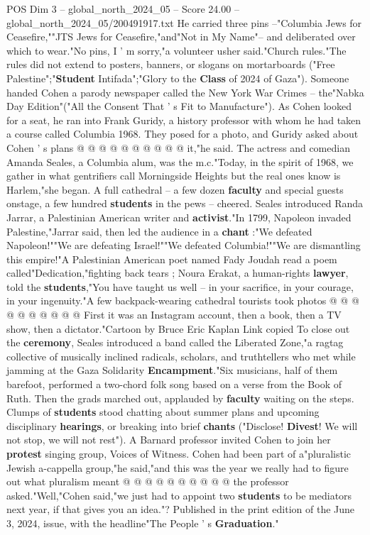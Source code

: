 \begin{textsample}{POS Dim 3 – global\_north\_2024\_05 – Score 24.00 – global\_north\_2024\_05/200491917.txt}
He carried three pins --"Columbia Jews for Ceasefire,""JTS Jews for Ceasefire,"and"Not in My Name"-- and deliberated over which to wear."No pins, I ' m sorry,"a volunteer usher said."Church rules."The rules did not extend to posters, banners, or slogans on mortarboards ("Free Palestine";"\textbf{Student} Intifada";"Glory to the \textbf{Class} of 2024 of Gaza").
Someone handed Cohen a parody newspaper called the New York War Crimes -- the"Nabka Day Edition"("All the Consent That ' s Fit to Manufacture").
As Cohen looked for a seat, he ran into Frank Guridy, a history professor with whom he had taken a course called Columbia 1968.
They posed for a photo, and Guridy asked about Cohen ' s plans @ @ @ @ @ @ @ @ @ @ it,"he said.
The actress and comedian Amanda Seales, a Columbia alum, was the m.c."Today, in the spirit of 1968, we gather in what gentrifiers call Morningside Heights but the real ones know is Harlem,"she began.
A full cathedral -- a few dozen \textbf{faculty} and special guests onstage, a few hundred \textbf{students} in the pews -- cheered.
Seales introduced Randa Jarrar, a Palestinian American writer and \textbf{activist}."In 1799, Napoleon invaded Palestine,"Jarrar said, then led the audience in a \textbf{chant} :"We defeated Napoleon!""We are defeating Israel!""We defeated Columbia!""We are dismantling this empire!"A Palestinian American poet named Fady Joudah read a poem called"Dedication,"fighting back tears ; Noura Erakat, a human-rights \textbf{lawyer}, told the \textbf{students},"You have taught us well -- in your sacrifice, in your courage, in your ingenuity."A few backpack-wearing cathedral tourists took photos @ @ @ @ @ @ @ @ @ @ First it was an Instagram account, then a book, then a TV show, then a dictator."Cartoon by Bruce Eric Kaplan Link copied To close out the \textbf{ceremony}, Seales introduced a band called the Liberated Zone,"a ragtag collective of musically inclined radicals, scholars, and truthtellers who met while jamming at the Gaza Solidarity \textbf{Encampment}."Six musicians, half of them barefoot, performed a two-chord folk song based on a verse from the Book of Ruth.
Then the grads marched out, applauded by \textbf{faculty} waiting on the steps.
Clumps of \textbf{students} stood chatting about summer plans and upcoming disciplinary \textbf{hearings}, or breaking into brief \textbf{chants} ("Disclose! \textbf{Divest}!
We will not stop, we will not rest").
A Barnard professor invited Cohen to join her \textbf{protest} singing group, Voices of Witness.
Cohen had been part of a"pluralistic Jewish a-cappella group,"he said,"and this was the year we really had to figure out what pluralism meant @ @ @ @ @ @ @ @ @ @ the professor asked."Well,"Cohen said,"we just had to appoint two \textbf{students} to be mediators next year, if that gives you an idea."?
Published in the print edition of the June 3, 2024, issue, with the headline"The People ' s \textbf{Graduation}."

\end{textsample}
